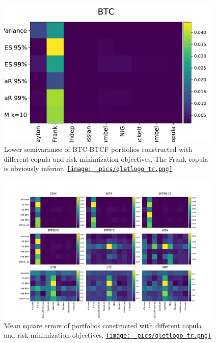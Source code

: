 \begin{figure}[ht]
    \centering
    \includegraphics[width=\textwidth]{_pics/semiLowerVariance_BTC.pdf}
  \caption{Lower semivariance of BTC-BTCF portfolios constructed with different copula and risk minimization objectives.
  The Frank copula is obviously inferior.
  \href{http://www.quantlet.com/}{\texttt{[image: \_pics/qletlogo\_tr.png]}} }
\label{fig:SLV_BTC}
\end{figure}

\begin{figure}[ht]
    \centering
    \includegraphics[width=\textwidth]{_pics/MSE_other.pdf}
  \caption{Mean square errors of portfolios constructed with different copula and risk minimization objectives.
  \href{http://www.quantlet.com/}{\texttt{[image: \_pics/qletlogo\_tr.png]}} }
\label{fig:MSE_other}
\end{figure}

